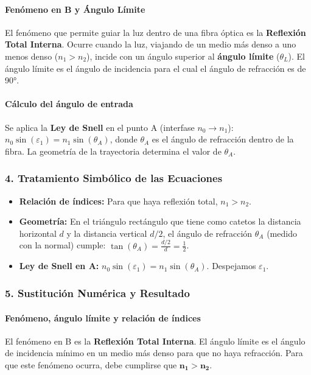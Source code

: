 \paragraph*{Fenómeno en B y Ángulo Límite}
El fenómeno que permite guiar la luz dentro de una fibra óptica es la \textbf{Reflexión Total Interna}. Ocurre cuando la luz, viajando de un medio más denso a uno menos denso ($n_1 > n_2$), incide con un ángulo superior al \textbf{ángulo límite} ($\theta_L$). El ángulo límite es el ángulo de incidencia para el cual el ángulo de refracción es de 90°.

\paragraph*{Cálculo del ángulo de entrada}
Se aplica la \textbf{Ley de Snell} en el punto A (interfase $n_0 \rightarrow n_1$): $n_0 \sin(\varepsilon_1) = n_1 \sin(\theta_A)$, donde $\theta_A$ es el ángulo de refracción dentro de la fibra. La geometría de la trayectoria determina el valor de $\theta_A$.

\subsubsection*{4. Tratamiento Simbólico de las Ecuaciones}
\begin{itemize}
    \item \textbf{Relación de índices:} Para que haya reflexión total, $n_1 > n_2$.
    \item \textbf{Geometría:} En el triángulo rectángulo que tiene como catetos la distancia horizontal $d$ y la distancia vertical $d/2$, el ángulo de refracción $\theta_A$ (medido con la normal) cumple: $\tan(\theta_A) = \frac{d/2}{d} = \frac{1}{2}$.
    \item \textbf{Ley de Snell en A:} $n_0 \sin(\varepsilon_1) = n_1 \sin(\theta_A)$. Despejamos $\varepsilon_1$.
\end{itemize}

\subsubsection*{5. Sustitución Numérica y Resultado}
\paragraph*{Fenómeno, ángulo límite y relación de índices}
\medskip
\begin{cajaresultado}
    El fenómeno en B es la \textbf{Reflexión Total Interna}. El ángulo límite es el ángulo de incidencia mínimo en un medio más denso para que no haya refracción. Para que este fenómeno ocurra, debe cumplirse que $\boldsymbol{n_1 > n_2}$.
\end{cajaresultado}
